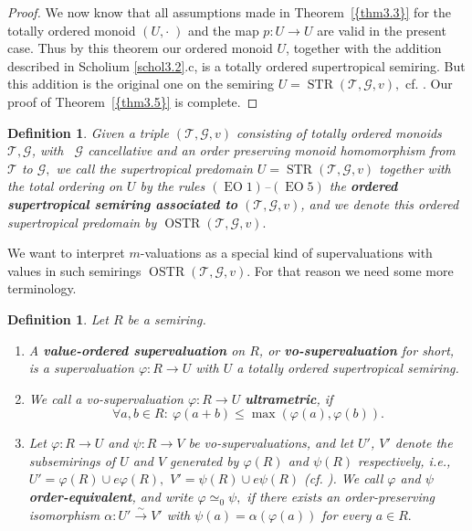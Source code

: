\documentclass [12pt,a4paper,reqno]{amsart}
\newtheorem{defn}[thm]{Definition}
\begin{document}
\begin{proof}
We now know that all assumptions made in {Theorem~\ref{{thm3.3}}} for the
totally ordered monoid $(U,\cdot \; )$ and the map $p:U\to U$ are
valid in the present case. Thus by this theorem our ordered monoid
$U$, together with the addition described in Scholium
\ref{schol3.2}.c, is a totally ordered supertropical semiring. But
this addition is the original one on the semiring $U={\operatorname{STR}}({\mathcal T},{\mathcal G}
,v),$ cf. \cite[Constuction 3.16]{IKR1}. Our proof of
{Theorem~\ref{{thm3.5}}} is complete.
\end{proof}

\begin{defn}\label{defn3.6}
Given a triple $({\mathcal T},{\mathcal G} ,v)$ consisting of totally ordered
monoids ${\mathcal T},{\mathcal G} $, with~ ${\mathcal G} $ cancellative and an order
preserving monoid homomorphism from ${\mathcal T}$ to ${\mathcal G} ,$ we call the
supertropical predomain $U={\operatorname{STR}}({\mathcal T},{\mathcal G} ,v)$ together with the
total ordering on $U$ by the rules $({\operatorname{EO}}1)$--$({\operatorname{EO}}5)$ the
{\textbf{{ordered supertropical semiring associated to}}} $({\mathcal T},{\mathcal G}
,v)$, and we denote this ordered supertropical predomain by
${\operatorname{OSTR}}({\mathcal T},{\mathcal G} ,v).$\end{defn}

We want to interpret $m$-valuations as a special kind  of
supervaluations with values in such semirings ${\operatorname{OSTR}}({\mathcal T},{\mathcal G} ,v).$
For that reason we need some more terminology.

\begin{defn}\label{defn3.7}
Let $R$ be a semiring.
\begin{enumerate}
\item[a)] A {\textbf{{value-ordered supervaluation}}} on $R$, or
{\textbf{{vo-supervaluation}}} for short, is a supervaluation $\varphi:
R\to U$ with $U$ a totally ordered supertropical semiring.
\item[b)] We call a vo-supervaluation $\varphi: R\to U$
{\textbf{{ultrametric}}}, if $$ \forall a,b\in R:\
\varphi(a+b)\le\max(\varphi(a),\varphi(b)).$$ \item[c)] Let
$\varphi: R\to U$ and $\psi: R\to V$ be vo-supervaluations, and
let $U'$, $V'$ denote the subsemirings of $U$ and $V$ generated by
$\varphi(R)$ and $\psi(R)$ respectively, i.e., $U'=\varphi(R)\cup
e\varphi(R),$ $V'=\psi(R)\cup e\psi(R)$ (cf. \cite[Proposition
4.2]{IKR1}). We call $\varphi$ and $\psi$ {\textbf{{order-equivalent}}},
and write $\varphi \simeq_0\psi,$ if there exists an
order-preserving isomorphism ${\alpha} : U'{\overset\sim \rightarrow} V'$ with $\psi(a)={\alpha}
({\varphi}(a))$ for every $a\in R.$
\end{enumerate}
\end{defn}
\end{document}
